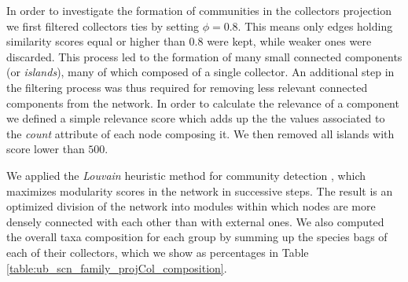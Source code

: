 In order to investigate the formation of communities in the collectors projection we first filtered collectors ties by setting $\phi = 0.8$.
This means only edges holding similarity scores equal or higher than $0.8$ were kept, while weaker ones were discarded.
This process led to the formation of many small connected components (or \textit{islands}), many of which composed of a single collector.
An additional step in the filtering process was thus required for removing less relevant connected components from the network.
In order to calculate the relevance of a component we defined a simple relevance score which adds up the the values associated to the \textit{count} attribute of each node composing it.
We then removed all islands with score lower than $500$.



We applied the \textit{Louvain} heuristic method for community detection \cite{Blondel2008}, which maximizes modularity scores in the network in successive steps.   
The result is an optimized division of the network into modules within which nodes are more densely connected with each other than with external ones.
We also computed the overall taxa composition for each group by summing up the species bags of each of their collectors, which we show as percentages in Table \ref{table:ub_scn_family_projCol_composition}.


